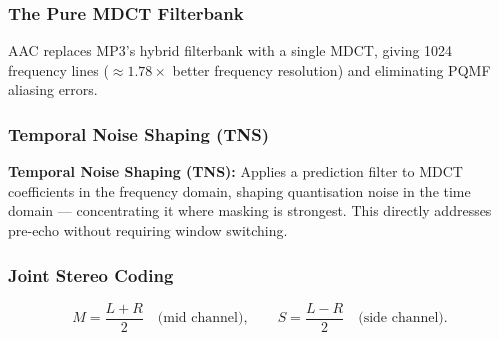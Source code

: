 \subsubsection{The Pure MDCT Filterbank}

AAC replaces MP3's hybrid filterbank with a single MDCT, giving 1024 frequency lines ($\approx 1.78\times$ better frequency resolution) and eliminating PQMF aliasing errors.

\subsubsection{Temporal Noise Shaping (TNS)}

\begin{definitionbox}
\textbf{Temporal Noise Shaping (TNS):} Applies a prediction filter to MDCT coefficients in the frequency domain, shaping quantisation noise in the time domain --- concentrating it where masking is strongest. This directly addresses pre-echo without requiring window switching.
\end{definitionbox}

\subsubsection{Joint Stereo Coding}

\[
M = \frac{L+R}{2} \quad \text{(mid channel)}, \qquad S = \frac{L-R}{2} \quad \text{(side channel)}.
\]

